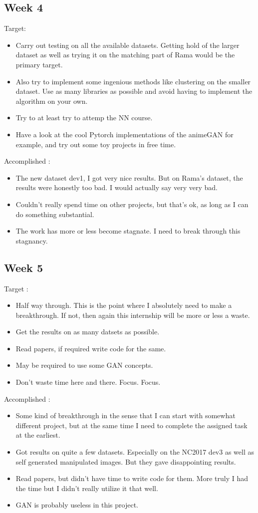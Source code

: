 \documentclass{article}
\begin{document}
\subsection{Week 4}
Target:
\begin{itemize}
\item Carry out testing on all the available datasets. Getting hold of the larger dataset as well as trying it on the matching part of Rama would be the primary target.
\item Also try to implement some ingenious methods like clustering on the smaller dataset. Use as many libraries as possible and avoid having to implement the algorithm on your own.
\item Try to at least try to attemp the NN course.
\item Have a look at the cool Pytorch implementations of the animeGAN for example, and try out some toy projects in free time.
\end{itemize}

Accomplished :
\begin{itemize}
\item The new dataset dev1, I got very nice results. But on Rama's dataset, the results were honestly too bad. I would actually say very very bad.
\item Couldn't really spend time on other projects, but that's ok, as long as I can do something substantial.
\item The work has more or less become stagnate. I need to break through this stagnancy.
\end{itemize}

\subsection{Week 5}
Target :
\begin{itemize}
\item Half way through. This is the point where I absolutely need to make a breakthrough. If not, then again this internship will be more or less a waste.
\item Get the results on as many datsets as possible.
\item Read papers, if required write code for the same.
\item May be required to use some GAN concepts.
\item Don't waste time here and there. Focus. Focus.
\end{itemize}

Accomplished :
\begin{itemize}
\item Some kind of breakthrough in the sense that I can start with somewhat different project, but at the same time I need to complete the assigned task at the earliest.
\item Got results on quite a few datasets. Especially on the NC2017 dev3 as well as self generated manipulated images. But they gave disappointing results.
\item Read papers, but didn't have time to write code for them. More truly I had the time but I didn't really utilize it that well.
\item GAN is probably useless in this project.
\end{itemize}
\end{document}
